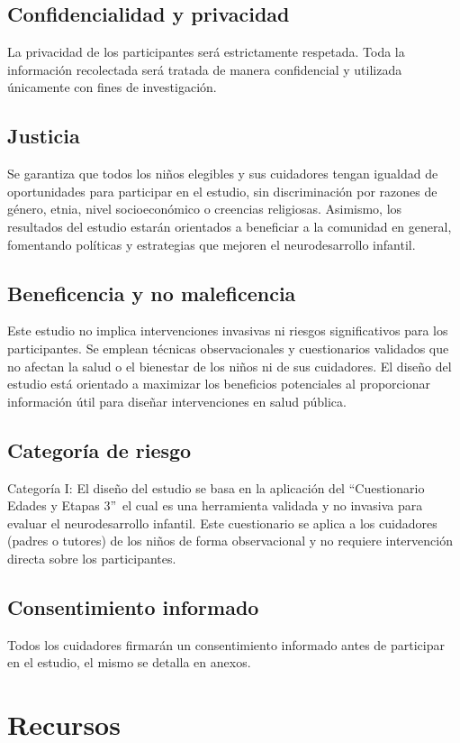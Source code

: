 \documentclass[11pt,letterpaper]{report}
\newcommand{\asq}{“Cuestionario Edades y Etapas 3”}
\begin{document}
\subsection{Confidencialidad y privacidad}
La privacidad de los participantes será estrictamente respetada. Toda la
información recolectada será tratada de manera confidencial y utilizada
únicamente con fines de investigación.

\subsection{Justicia}
Se garantiza que todos los niños elegibles y sus cuidadores tengan igualdad de
oportunidades para participar en el estudio, sin discriminación por razones de
género, etnia, nivel socioeconómico o creencias religiosas. Asimismo, los
resultados del estudio estarán orientados a beneficiar a la comunidad en
general, fomentando políticas y estrategias que mejoren el neurodesarrollo
infantil.

\subsection{Beneficencia y no maleficencia}
Este estudio no implica intervenciones invasivas ni riesgos significativos para
los participantes. Se emplean técnicas observacionales y cuestionarios
validados que no afectan la salud o el bienestar de los niños ni de sus
cuidadores. El diseño del estudio está orientado a maximizar los beneficios
potenciales al proporcionar información útil para diseñar intervenciones en
salud pública.

\subsection{Categoría de riesgo}
Categoría I: El diseño del estudio se basa en la aplicación del \asq\ el cual
es una herramienta validada y no invasiva para evaluar el neurodesarrollo
infantil. Este cuestionario se aplica a los cuidadores (padres o tutores) de
los niños de forma observacional y no requiere intervención directa sobre los
participantes.

\subsection{Consentimiento informado}
Todos los cuidadores firmarán un consentimiento informado antes de participar
en el estudio, el mismo se detalla en anexos.

\section{Recursos}
\end{document}
